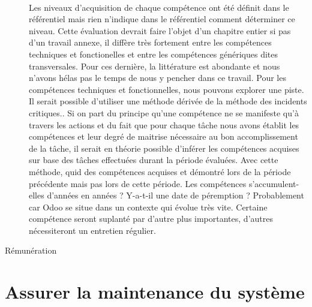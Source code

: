 \begin{description}
\paragraph{}Les niveaux d'acquisition de chaque compétence ont été définit dans le référentiel mais rien n'indique dans le référentiel comment déterminer ce niveau. Cette évaluation devrait faire l'objet d'un chapitre entier si pas d'un travail annexe, il diffère très fortement entre les compétences techniques et fonctionelles et entre les compétences génériques dites transversales. Pour ces dernière, la littérature est abondante et nous n'avons hélas pas le temps de nous y pencher dans ce travail. Pour les compétences techniques et fonctionnelles, nous pouvons explorer une piste. Il serait possible d'utiliser une méthode dérivée de la méthode des incidents critiques.\citep[pp.272]{gestionressourceshumaine2002}. Si on part du principe qu'une compétence ne se manifeste qu'à travers les actions\citep[pp.171]{gestionressourceshumaine2007} et du fait que pour chaque tâche nous avons établit les compétences et leur degré de maitrise nécessaire au bon accomplissement de la tâche, il serait en théorie possible d'inférer les compétences acquises sur base des tâches effectuées durant la période évaluées. Avec cette méthode, quid des compétences acquises et démontré lors de la période précédente mais pas lors de cette période. Les compétences s'accumulent-elles d'années en années ? Y-a-t-il une date de péremption ? Probablement car Odoo se situe dans un contexte qui évolue très vite. Certaine compétence seront suplanté par d'autre plus importantes, d'autres nécessiteront un entretien régulier. 

  \item[Rémunération]
\end{description}


\section{Assurer la maintenance du système}

 




